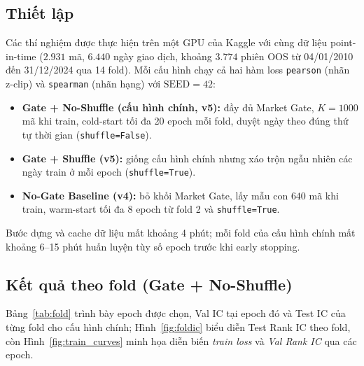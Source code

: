 \documentclass[a4paper,12pt]{article}
\begin{document}
\subsection{Thiết lập}
Các thí nghiệm được thực hiện trên một GPU của Kaggle với cùng dữ liệu point-in-time ($2.931$ mã, $6.440$ ngày giao dịch, khoảng $3.774$ phiên OOS từ 04/01/2010 đến 31/12/2024 qua 14 fold). Mỗi cấu hình chạy cả hai hàm loss \texttt{pearson} (nhãn z-clip) và \texttt{spearman} (nhãn hạng) với $\mathrm{SEED}=42$:
\begin{itemize}
    \item \textbf{Gate + No-Shuffle (cấu hình chính, v5):} đầy đủ Market Gate, $K=1000$ mã khi train, cold-start tối đa 20 epoch mỗi fold, duyệt ngày theo đúng thứ tự thời gian (\texttt{shuffle=False}).
    \item \textbf{Gate + Shuffle (v5):} giống cấu hình chính nhưng xáo trộn ngẫu nhiên các ngày train ở mỗi epoch (\texttt{shuffle=True}).
    \item \textbf{No-Gate Baseline (v4):} bỏ khối Market Gate, lấy mẫu con $640$ mã khi train, warm-start tối đa 8 epoch từ fold 2 và \texttt{shuffle=True}.
\end{itemize}
Bước dựng và cache dữ liệu mất khoảng 4 phút; mỗi fold của cấu hình chính mất khoảng 6--15 phút huấn luyện tùy số epoch trước khi early stopping.

\subsection{Kết quả theo fold (Gate + No-Shuffle)}
Bảng~\ref{tab:fold} trình bày epoch được chọn, Val IC tại epoch đó và Test IC của từng fold cho cấu hình chính; Hình~\ref{fig:foldic} biểu diễn Test Rank IC theo fold, còn Hình~\ref{fig:train_curves} minh họa diễn biến \textit{train loss} và \textit{Val Rank IC} qua các epoch.
\end{document}
